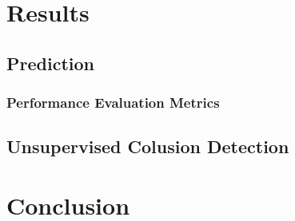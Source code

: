 \documentclass[a4paper,12pt, headsepline]{scrartcl}
\numberwithin{equation}{section}
\begin{document}
\section{Results}\label{sec:res}
\subsection{Prediction}\label{subsec:pred}
\subsubsection{Performance Evaluation Metrics}\label{subsubsec:per}
\subsection{Unsupervised Colusion Detection}\label{subsec:col}
\section{Conclusion}\label{sec:con}
 
\newpage
\printbibliography
\end{document}
